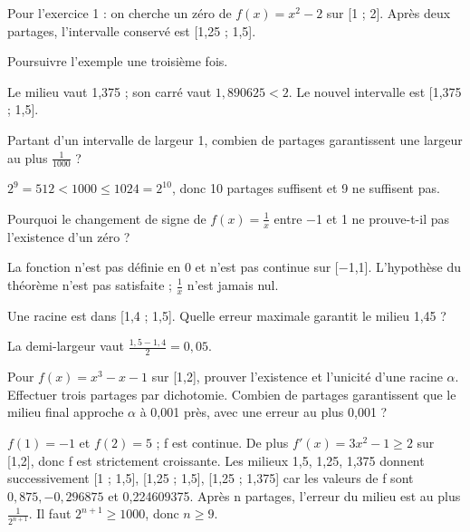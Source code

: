\documentclass[11pt]{article}
\begin{document}
Pour l’exercice 1 : on cherche un zéro de \(f(x)=x^{2}-2\) sur [1 ; 2]. Après deux partages, l’intervalle conservé est [1,25 ; 1,5].\par
{}
Poursuivre l’exemple une troisième fois.\par
Le milieu vaut 1,375 ; son carré vaut \(1,890625<2\). Le nouvel intervalle est [1,375 ; 1,5].\par
{}
Partant d’un intervalle de largeur 1, combien de partages garantissent une largeur au plus \(\frac{1}{1000}\) ?\par
\(2^{9}=512<1000\leq 1024=2^{10}\), donc 10 partages suffisent et 9 ne suffisent pas.\par
{}
Pourquoi le changement de signe de \(f(x)=\frac{1}{x}\) entre −1 et 1 ne prouve-t-il pas l’existence d’un zéro ?\par
La fonction n’est pas définie en 0 et n’est pas continue sur [−1,1]. L’hypothèse du théorème n’est pas satisfaite ; \(\frac{1}{x}\) n’est jamais nul.\par
{}
Une racine est dans [1,4 ; 1,5]. Quelle erreur maximale garantit le milieu 1,45 ?\par
La demi-largeur vaut \(\frac{1,5-1,4}{2}=0,05\).\par
{}
Pour \(f(x)=x^{3}-x-1\) sur [1,2], prouver l’existence et l’unicité d’une racine \(\alpha \). Effectuer trois partages par dichotomie. Combien de partages garantissent que le milieu final approche \(\alpha \) à 0,001 près, avec une erreur au plus 0,001 ?\par
\(f(1)=-1\) et \(f(2)=5\) ; f est continue. De plus \(f'(x)=3x^{2}-1\geq 2\) sur [1,2], donc f est strictement croissante. Les milieux 1,5, 1,25, 1,375 donnent successivement [1 ; 1,5], [1,25 ; 1,5], [1,25 ; 1,375] car les valeurs de f sont \(0,875, -0,296875\) et 0,224609375. Après n partages, l’erreur du milieu est au plus \(\frac{1}{2^{n+1}}\). Il faut \(2^{n+1}\geq 1000\), donc \(n\geq 9\).\par
\end{document}
